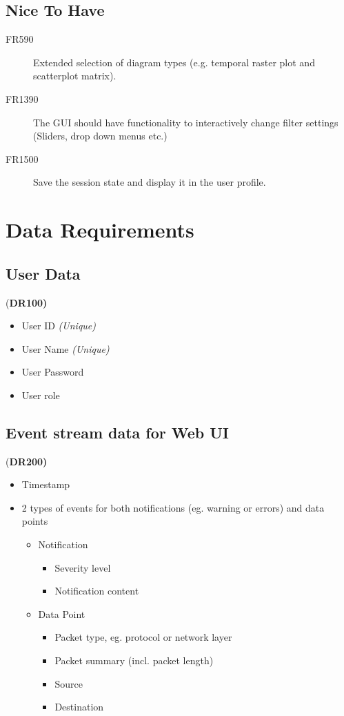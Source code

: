 \documentclass[twoside, english, final]{Pflichtenheft}
\begin{document}
\subsection{Nice To Have}
\begin{description}
	\item[FR590]
	      Extended selection of diagram types (e.g. temporal raster plot and scatterplot matrix).
	\item[FR1390]
	      The GUI should have functionality to interactively change filter settings  (Sliders, drop down menus etc.)
	\item[FR1500]
	      Save the session state and display it in the user profile.
\end{description}

\section{Data Requirements}
\subsection{User Data} (\textbf{DR100)}

\begin{itemize}
	\item User ID \textit{(Unique)}
	\item User Name \textit{(Unique)}
	\item User Password
	\item User \gls{role}
\end{itemize}


\subsection{Event stream data for Web UI} (\textbf{DR200)}

\begin{itemize}
	\item Timestamp
	\item 2 types of events for both notifications (eg. warning or errors) and data points
	      \begin{itemize}
		      \item Notification
		            \begin{itemize}
			            \item Severity level
			            \item Notification content
		            \end{itemize}
		      \item Data Point
		            \begin{itemize}
			            \item Packet type, eg. protocol or network layer
			            \item Packet summary (incl. packet length)
			            \item Source
			            \item Destination
		            \end{itemize}
	      \end{itemize}
\end{itemize}
\end{document}
